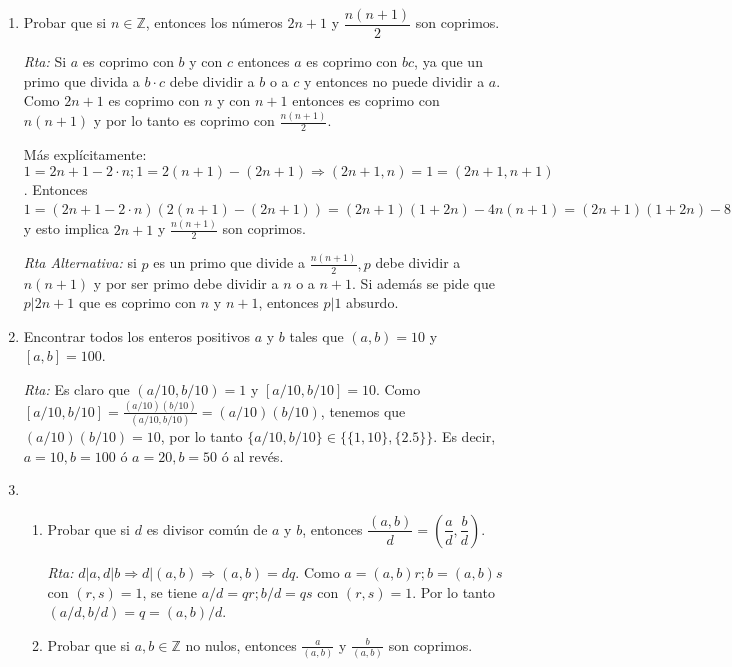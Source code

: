 \documentclass[a4paper,12pt,twoside,spanish,reqno]{amsbook}
\numberwithin{equation}{section}
\newcommand{\rta}{\noindent\textit{Rta: }}
\begin{document}
\begin{enumerate}
\begin{enumerate}
\end{enumerate}





\item Probar que si $n \in {\mathbb Z}$, entonces los números $2n+1$ y $\dfrac{n(n+1)}{2}$ son coprimos.

\rta Si $a$ es coprimo con $b$ y con $c$ entonces $a$ es coprimo con $bc$, ya que un primo que divida a $b\cdot c$ debe dividir a $b$ o a $c$ y entonces no puede dividir a $a$. Como $2n+1$ es coprimo con $n$ y con $n+1$ entonces es coprimo con $n(n+1)$ y por lo tanto es coprimo con $\frac{n(n+1)}{2}$.

Más explícitamente: $1=2n+1-2\cdot n; 1=2(n+1)-(2n+1) \Rightarrow (2n+1,n)=1=(2n+1, n+1)$.
Entonces  $1=(2n+1-2\cdot n)(2(n+1)-(2n+1))=(2n+1)(1+2n)-4n(n+1)=(2n+1)(1+2n)-8\frac{n(n+1)}{2}$ y esto implica $2n+1$ y $\frac{n(n+1)}{2}$ son coprimos.

\noindent\textit{Rta Alternativa: } si $p$ es un primo que divide a $\frac{n(n+1)}{2}, p$ debe dividir a $n(n+1)$ y por ser primo debe dividir a $n$ o a $n+1$. Si además se pide que $p\vert 2n+1$ que es coprimo con $n$ y $n+1$, entonces $p\vert 1$ absurdo.




\item Encontrar todos los enteros positivos $a$ y $b$ tales que $(a,b)=10$ y $[a,b]=100$.

\rta Es claro que $(a/10,b/10)=1$ y $[a/10,b/10] = 10$. Como $[a/10,b/10] = \displaystyle\frac{(a/10)(b/10)}{(a/10,b/10)}= (a/10)(b/10)$,  tenemos que $(a/10)(b/10) = 10$, por lo tanto $\{a/10,b/10\}\in \{\{1,10\},\{2.5\}\}$. Es decir, $a=10, b=100$ ó $a=20, b=50$ ó al revés.





\item
\begin{enumerate}
    \item Probar que si $d$ es divisor común de $a$ y $b$, entonces $\dfrac{(a,b)}{d} = \left(\dfrac{a}{d}, \dfrac{b}{d}\right)$.
    
     \rta  $d\vert a, d\vert b\Rightarrow d\vert(a,b)\Rightarrow (a,b)=dq$. Como $a=(a,b)r; b=(a, b)s$ con $(r, s)=1$, se tiene $a/d=qr; b/d=qs$ con $(r, s)=1$. Por lo tanto $(a/d, b/d)=q=(a,b)/d$.
    
    \item Probar que si $a,b\in \mathbb Z$ no nulos, entonces  $\displaystyle \frac a{(a,b)}$ y $\displaystyle \frac b{(a,b)}$ son coprimos.
    

\end{enumerate}
\end{enumerate}
\end{document}
